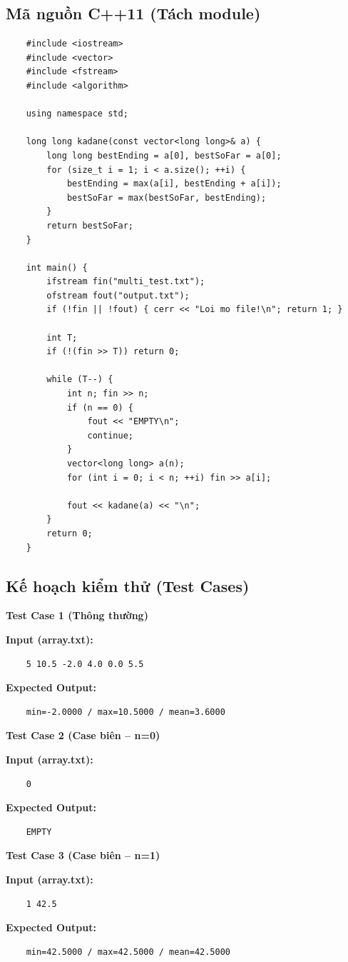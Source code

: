 \subsection{Mã nguồn C++11 (Tách module)}
    \begin{lstlisting}
    #include <iostream>
    #include <vector>
    #include <fstream>
    #include <algorithm>

    using namespace std;

    long long kadane(const vector<long long>& a) {
        long long bestEnding = a[0], bestSoFar = a[0];
        for (size_t i = 1; i < a.size(); ++i) {
            bestEnding = max(a[i], bestEnding + a[i]);
            bestSoFar = max(bestSoFar, bestEnding);
        }
        return bestSoFar;
    }

    int main() {
        ifstream fin("multi_test.txt");
        ofstream fout("output.txt");
        if (!fin || !fout) { cerr << "Loi mo file!\n"; return 1; }

        int T;
        if (!(fin >> T)) return 0;

        while (T--) {
            int n; fin >> n;
            if (n == 0) {
                fout << "EMPTY\n";
                continue;
            }
            vector<long long> a(n);
            for (int i = 0; i < n; ++i) fin >> a[i];
            
            fout << kadane(a) << "\n";
        }
        return 0;
    }
\end{lstlisting}

\subsection{Kế hoạch kiểm thử (Test Cases)}

    \textbf{Test Case 1 (Thông thường)}

    \textbf{Input (array.txt):}
    \begin{lstlisting}
    5 10.5 -2.0 4.0 0.0 5.5\end{lstlisting}

    \textbf{Expected Output:}
    \begin{lstlisting}
    min=-2.0000 / max=10.5000 / mean=3.6000\end{lstlisting}

    \vspace{0.5cm}

    \textbf{Test Case 2 (Case biên -- n=0)}

    \textbf{Input (array.txt):}
    \begin{lstlisting}
    0\end{lstlisting}

    \textbf{Expected Output:}
    \begin{lstlisting}
    EMPTY\end{lstlisting}
    \textbf{Test Case 3 (Case biên -- n=1)}

    \textbf{Input (array.txt):}
    \begin{lstlisting}
    1 42.5\end{lstlisting}

    \textbf{Expected Output:}
    \begin{lstlisting}
    min=42.5000 / max=42.5000 / mean=42.5000\end{lstlisting}